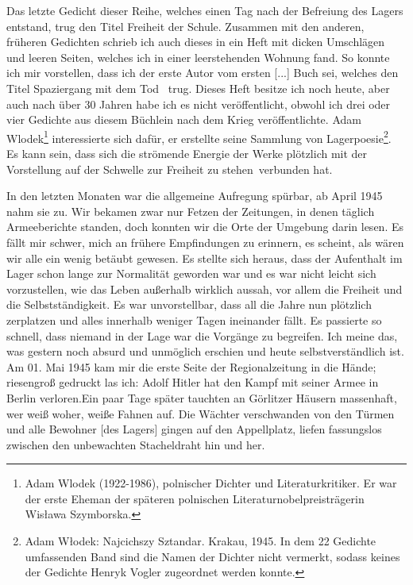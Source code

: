Das letzte Gedicht dieser Reihe, welches einen Tag nach der Befreiung des Lagers entstand, trug den Titel \glqq Freiheit der Schule\grqq. Zusammen mit den anderen, früheren Gedichten schrieb ich auch dieses in ein Heft mit dicken Umschlägen und leeren Seiten, welches ich in einer leerstehenden Wohnung fand. So konnte ich mir vorstellen, dass ich der erste Autor vom ersten [...] Buch sei, welches den Titel \glqq Spaziergang mit dem Tod\grqq~ trug. Dieses Heft besitze ich noch heute, aber auch nach über 30 Jahren habe ich es nicht veröffentlicht, obwohl ich drei oder vier Gedichte aus diesem Büchlein nach dem Krieg veröffentlichte. Adam Wlodek\footnote{Adam Wlodek (1922-1986), polnischer Dichter und Literaturkritiker. Er war der erste Eheman der späteren polnischen Literaturnobelpreisträgerin Wis\l awa Szymborska.} interessierte sich dafür, er erstellte seine Sammlung von Lagerpoesie\footnote{Adam W\l odek: Najcichszy Sztandar. Krakau, 1945. In dem 22 Gedichte umfassenden Band sind die Namen der Dichter nicht vermerkt, sodass keines der Gedichte Henryk Vogler zugeordnet werden konnte.}.
Es kann sein, dass sich die strömende Energie der Werke plötzlich mit der Vorstellung \glqq auf der Schwelle zur Freiheit zu stehen\grqq~verbunden hat. 

In den letzten Monaten war die allgemeine Aufregung spürbar, ab April 1945 nahm sie zu. Wir bekamen zwar nur Fetzen der Zeitungen, in denen täglich Armeeberichte standen, doch konnten wir die Orte der Umgebung darin lesen. Es fällt mir schwer, mich an frühere Empfindungen zu erinnern, es scheint, als wären wir alle ein wenig betäubt gewesen. Es stellte sich heraus, dass der Aufenthalt im Lager schon lange zur Normalität geworden war und es war nicht leicht sich vorzustellen, wie das Leben außerhalb wirklich aussah, vor allem die Freiheit und die Selbstständigkeit. Es  war unvorstellbar, dass all die Jahre nun plötzlich zerplatzen und alles  innerhalb weniger Tagen ineinander fällt. Es passierte so schnell, dass niemand in der Lage war die Vorgänge zu begreifen. Ich meine das, was gestern noch absurd und unmöglich erschien und heute selbstverständlich ist. Am 01. Mai 1945 kam mir die erste Seite der Regionalzeitung in die Hände; riesengroß gedruckt las ich: \glqq Adolf Hitler hat den Kampf mit seiner Armee in Berlin verloren.\grqq Ein paar Tage später tauchten an Görlitzer Häusern massenhaft, wer weiß woher, weiße Fahnen auf. Die Wächter verschwanden von den Türmen und alle Bewohner [des Lagers] gingen auf den Appellplatz, liefen fassungslos zwischen den unbewachten Stacheldraht hin und her. 


